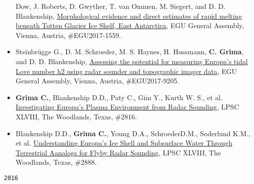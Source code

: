 \begin{itemize}
  Dow, J. Roberts, D. Gwyther, T. van Ommen, M. Siegert, and D. D.
  Blankenship,
  \href{http://meetingorganizer.copernicus.org/EGU2017/EGU2017-1559.pdf}{Morphological
  evidence and direct estimates of rapid melting beneath Totten Glacier
  Ice Shelf, East Antarctica}, EGU General Assembly, Vienna, Austria,
  \#EGU2017-1559.
\item
  Steinbrügge G., D. M. Schroeder, M. S. Haynes, H. Hussmann, \textbf{C.
  Grima}, and D. D. Blankenship,
  \href{http://meetingorganizer.copernicus.org/EGU2017/EGU2017-9205.pdf}{Assessing
  the potential for measuring Europa's tidal Love number h2 using radar
  sounder and topographic imager data}, EGU General Assembly, Vienna,
  Austria, \#EGU2017-9205.
\item
  \textbf{Grima C.}, Blankenship D.D., Paty C., Gim Y., Kurth W. S., et
  al.
  \href{http://www.lpi.usra.edu/meetings/lpsc2017/pdf/2816.pdf}{Investigating
  Europa's Plasma Environment from Radar Sounding}, LPSC XLVIII, The
  Woodlands, Texas, \#2816.
\item
  Blankenship D.D., \textbf{Grima C.}, Young D.A., SchroederD.M.,
  Soderlund K.M., et al.
  \href{http://www.lpi.usra.edu/meetings/lpsc2017/pdf/2888.pdf}{Understanding
  Europa's Ice Shell and Subsurface Water Through Terrestrial Aanalogs
  for Flyby Radar Sounding}, LPSC XLVIII, The Woodlands, Texas, \#2888.
\end{itemize}

\noindent\texttt{2016}

